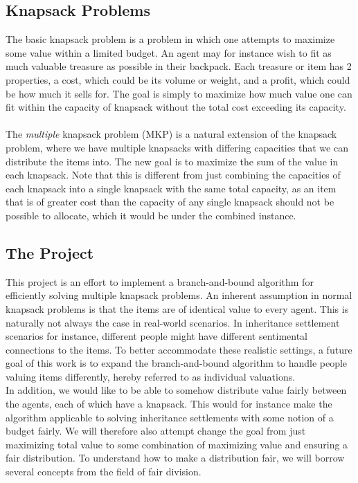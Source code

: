 \documentclass[b5paper]{article}
\begin{document}
\subsection{Knapsack Problems}
The basic knapsack problem is a problem in which one attempts to maximize some value
within a limited budget. An agent may for instance wish to fit as much valuable treasure as possible in their backpack.
Each treasure or item has 2 properties, a cost, which could be its volume or weight, and a profit, which could be how much it sells for. 
The goal is simply to maximize how much value one can fit within the capacity of knapsack without the total cost exceeding its capacity.
\\ \\
The \emph{multiple} knapsack problem (MKP) is a natural extension of the knapsack problem, where we have
multiple knapsacks with differing capacities that we can distribute the items into. The new goal is to maximize the sum of the value
in each knapsack. Note that this is different from just combining the capacities of each knapsack into a single knapsack
with the same total capacity, as an item that is of greater cost than the capacity of any single knapsack should not be possible to allocate,
which it would be under the combined instance.

\subsection{The Project}
This project is an effort to implement a branch-and-bound algorithm for efficiently solving multiple knapsack problems.
An inherent assumption in normal knapsack problems is that the items are of identical value to every agent.
This is naturally not always the case in real-world scenarios. In inheritance settlement scenarios for instance, different people might have different sentimental connections to the items.
To better accommodate these realistic settings, a future goal of this work is to expand the branch-and-bound algorithm to handle people valuing items differently, hereby referred to as individual valuations.
\\
In addition, we would like to be able to somehow distribute value fairly between the agents, each of which have a knapsack.
This would for instance make the algorithm applicable to solving inheritance settlements with some notion of a budget fairly.
We will therefore also attempt change the goal from just maximizing total value to some combination of maximizing value and ensuring a fair distribution. 
To understand how to make a distribution fair, we will borrow several concepts from the field of fair division.
\end{document}
